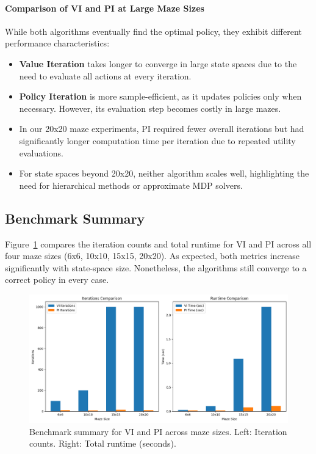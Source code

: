 \documentclass[11pt]{article}
\begin{document}
\paragraph{Comparison of VI and PI at Large Maze Sizes}
While both algorithms eventually find the optimal policy, they exhibit different performance characteristics:
\begin{itemize}
    \item \textbf{Value Iteration} takes longer to converge in large state spaces due to the need to evaluate all actions at every iteration.
    \item \textbf{Policy Iteration} is more sample-efficient, as it updates policies only when necessary. However, its evaluation step becomes costly in large mazes.
    \item In our 20x20 maze experiments, PI required fewer overall iterations but had significantly longer computation time per iteration due to repeated utility evaluations.
    \item For state spaces beyond 20x20, neither algorithm scales well, highlighting the need for hierarchical methods or approximate MDP solvers.
\end{itemize}

\newpage
\subsection{Benchmark Summary}
Figure~\ref{fig:benchmark_summary} compares the iteration counts and total runtime for VI and PI across all four maze sizes (6x6, 10x10, 15x15, 20x20). As expected, both metrics increase significantly with state-space size. Nonetheless, the algorithms still converge to a correct policy in every case.

\begin{figure}[H]
    \centering
    \includegraphics[width=\textwidth]{benchmark_summary.png}
    \caption{Benchmark summary for VI and PI across maze sizes. Left: Iteration counts. Right: Total runtime (seconds).}
    \label{fig:benchmark_summary}
\end{figure}
\end{document}
